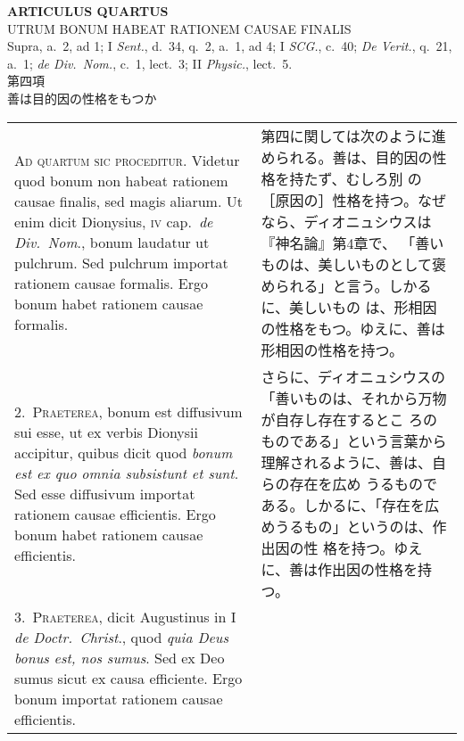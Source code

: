 \documentclass[10pt]{jsarticle} %
\begin{document}
\newpage
{}

\begin{center}
 {\Large {\bf ARTICULUS QUARTUS}}\\
 {\large UTRUM BONUM HABEAT RATIONEM CAUSAE FINALIS}\\
 {\footnotesize Supra, a.~2, ad 1; I {\itshape Sent.}, d.~34, q.~2,
 a.~1, ad 4; I {\itshape SCG.}, c.~40; {\itshape De Verit.}, q.~21,
 a.~1; {\itshape de Div.~Nom.}, c.~1, lect.~3; II {\itshape Physic.}, lect.~5.}\\
 {\Large 第四項\\善は目的因の性格をもつか}
\end{center}

\begin{longtable}{p{21em}p{21em}}







{\huge A}{\scshape d quartum sic proceditur}. Videtur quod bonum non
 habeat rationem causae finalis, sed magis aliarum. Ut enim dicit
 Dionysius, {\scshape iv} cap.~{\itshape de Div.~Nom}., bonum laudatur
 ut pulchrum{\itshape }. Sed pulchrum importat rationem causae
 formalis. Ergo bonum habet rationem causae formalis.

&


第四に関しては次のように進められる。善は、目的因の性格を持たず、むしろ別
 の［原因の］性格を持つ。なぜなら、ディオニュシウスは『神名論』第4章で、
 「善いものは、美しいものとして褒められる」と言う。しかるに、美しいもの
 は、形相因の性格をもつ。ゆえに、善は形相因の性格を持つ。


\\


2.~{\scshape Praeterea}, bonum est diffusivum sui esse, ut ex verbis
 Dionysii accipitur, quibus dicit quod {\itshape bonum est ex quo omnia
 subsistunt et sunt}. Sed esse diffusivum importat rationem causae
 efficientis. Ergo bonum habet rationem causae efficientis.

&


さらに、ディオニュシウスの「善いものは、それから万物が自存し存在するとこ
 ろのものである」という言葉から理解されるように、善は、自らの存在を広め
 うるものである。しかるに、「存在を広めうるもの」というのは、作出因の性
 格を持つ。ゆえに、善は作出因の性格を持つ。



\\


3.~{\scshape Praeterea}, dicit Augustinus in I {\itshape de
 Doctr.~Christ}., quod {\itshape quia Deus bonus est, nos sumus}. Sed ex
 Deo sumus sicut ex causa efficiente. Ergo bonum importat rationem
 causae efficientis.


\end{longtable}
\end{document}

